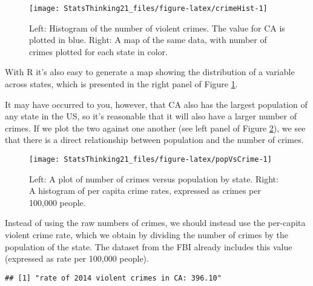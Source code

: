 \documentclass[]{book}
\newenvironment{Shaded}{\begin{snugshade}}{\end{snugshade}}
\newcommand{\KeywordTok}[1]{\textcolor[rgb]{0.13,0.29,0.53}{\textbf{#1}}}
\newcommand{\StringTok}[1]{\textcolor[rgb]{0.31,0.60,0.02}{#1}}
\newcommand{\CommentTok}[1]{\textcolor[rgb]{0.56,0.35,0.01}{\textit{#1}}}
\newcommand{\OperatorTok}[1]{\textcolor[rgb]{0.81,0.36,0.00}{\textbf{#1}}}
\newcommand{\NormalTok}[1]{#1}
\theoremstyle{definition}
\theoremstyle{definition}
\theoremstyle{definition}
\theoremstyle{remark}
\begin{document}
\begin{figure}
\texttt{[image: StatsThinking21\_files/figure-latex/crimeHist-1]} \caption{Left: Histogram of the number of violent crimes.  The value for CA is plotted in blue. Right: A map of the same data, with number of crimes plotted for each state in color.}\label{fig:crimeHist}
\end{figure}

With R it's also easy to generate a map showing the distribution of a
variable across states, which is presented in the right panel of Figure
\ref{fig:crimeHist}.

It may have occurred to you, however, that CA also has the largest
population of any state in the US, so it's reasonable that it will also
have a larger number of crimes. If we plot the two against one another
(see left panel of Figure \ref{fig:popVsCrime}), we see that there is a
direct relationship between population and the number of crimes.

\begin{figure}
\texttt{[image: StatsThinking21\_files/figure-latex/popVsCrime-1]} \caption{Left: A plot of number of crimes versus population by state. Right: A histogram of per capita crime rates, expressed as crimes per 100,000 people.}\label{fig:popVsCrime}
\end{figure}

Instead of using the raw numbers of crimes, we should instead use the
per-capita violent crime rate, which we obtain by dividing the number of
crimes by the population of the state. The dataset from the FBI already
includes this value (expressed as rate per 100,000 people).

\begin{Shaded}
\end{Shaded}

\begin{verbatim}
## [1] "rate of 2014 violent crimes in CA: 396.10"
\end{verbatim}

\begin{Shaded}
\end{Shaded}
\end{document}
